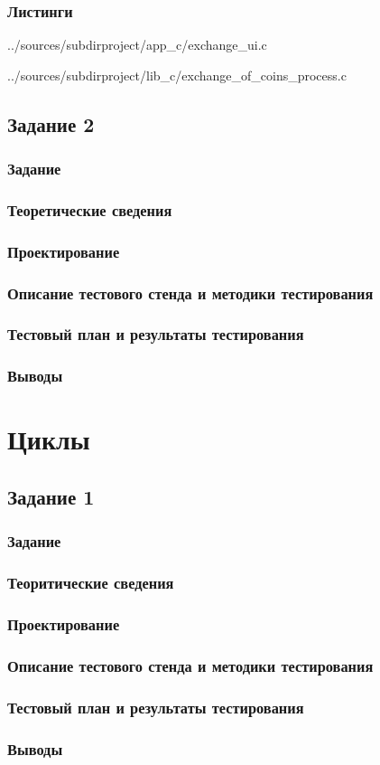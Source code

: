 \documentclass[12pt,a4paper]{report}
\begin{document}
\subsection*{Листинги}

{../sources/subdirproject/app_c/exchange_ui.c}


{../sources/subdirproject/lib_c/exchange_of_coins_process.c}


\section{Задание 2}
\subsection{Задание}
\subsection{Теоретические сведения}
\subsection{Проектирование}
\subsection{Описание тестового стенда и методики тестирования}
\subsection{Тестовый план и результаты тестирования}
\subsection{Выводы}
\chapter{Циклы}
\section{Задание 1}
\subsection{Задание}
\subsection{Теоритические сведения}
\subsection{Проектирование}
\subsection{Описание тестового стенда и методики тестирования}
\subsection{Тестовый план и результаты тестирования}
\subsection{Выводы}
\end{document}
